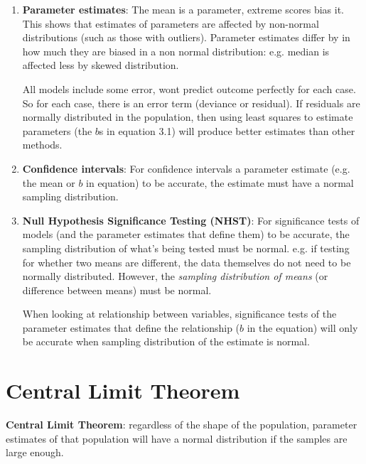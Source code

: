 \begin{enumerate}
\item \textbf{Parameter estimates}: The mean is a parameter, extreme scores bias it. This shows that estimates of parameters are affected by non-normal distributions (such as those with outliers). Parameter estimates differ by in how much they are biased in a non normal distribution: e.g. median is affected less by skewed distribution.

All models include some error, wont predict outcome perfectly for each case. So for each case, there is an error term (deviance or residual). If residuals are normally distributed in the population, then using least squares to estimate parameters (the $b$s in equation 3.1) will produce better estimates than other methods.
\item \textbf{Confidence intervals}: For confidence intervals a parameter estimate (e.g. the mean or $b$ in equation) to be accurate, the estimate must have a normal sampling distribution.
\item \textbf{Null Hypothesis Significance Testing (NHST)}: For significance tests of models (and the parameter estimates that define them) to be accurate, the sampling distribution of what's being tested must be normal. e.g. if testing for whether two means are different, the data themselves do not need to be normally distributed. However, the \emph{sampling distribution of means} (or difference between means) must be normal. 

When looking at relationship between variables, significance tests of the parameter estimates that define the relationship ($b$ in the equation) will only be accurate when sampling distribution of the estimate is normal.
\end{enumerate}

\section{Central Limit Theorem}
\textbf{Central Limit Theorem}: regardless of the shape of the population, parameter estimates of that population will have a normal distribution if the samples are large enough.
